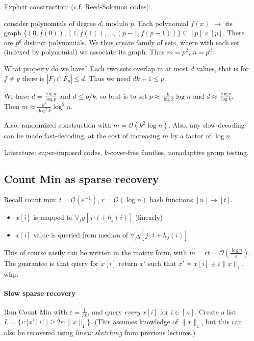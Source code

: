 \documentclass[11pt]{article}
\newcommand{\bigo}{\mathcal{O}}
\begin{document}
Explicit construction: (c.f. Reed-Solomon codes):

consider polynomials of degree $d$, modulo $p$. Each polynomial $f(x)$ $\to$ its graph $\{(0,f(0)), (1,f(1)), \ldots, (p-1,f(p-1))\} \subseteq [p] \times [p]$. There are $p^d$ distinct polynomials. We thus create family of sets, where with each set (indexed by polynomial) we associate its graph. Thus $m = p^2$, $n = p^d$.

What property do we have? Each two sets overlap in at most $d$ values, that is for $f \not = g$ there is $|F_f \cap F_g| \le d$. Thus we need $dk + 1 \le p$.

We have $d = \frac{\log n}{\log p}$ and $d \le p/k$, so best is to set $p \approx \frac{k}{\log k} \log n$ and $d \approx \frac{\log n}{\log k}$. Then $m \approx \frac{k^2}{\log^2 k} \log^2 n$.


Also: randomized construction with $m =\bigo(k^2 \log n)$. Also, any slow-decoding can be made fast-decoding, at the cost of increasing $m$ by a factor of $\log n$.

Literature: super-imposed codes, $k$-cover-free families, nonadaptive group testing.
\subsection{Count Min as sparse recovery}
Recall count min: $t = \bigo(\varepsilon^{-1})$, $r = \bigo(\log n)$ hash functions $[n] \to [t]$.
\begin{itemize}
\item $x[i]$ is mapped to $\forall_j y[j \cdot t + h_j(i)]$ (linearly)
\item $x[i]$ value is queried from median of $\forall_j y[j \cdot t + h_j(i)]$
\end{itemize}
This of course easily can be written in the matrix form, with $m = rt = \bigo(\frac{\log n}{\varepsilon})$. 
The guarantee is that query for $x[i]$ return $x'$ such that $x' = x[i] \pm \varepsilon \|x\|_1$, whp.

\paragraph{Slow sparse recovery}
Run Count Min with $\varepsilon = \frac{1}{3k}$, and query \emph{every} $x[i]$ for $i \in [n]$. Create a list $L = \{ i : |x'[i]| \ge  2\varepsilon \cdot \|x\|_1 \}$. (This assumes knowledge of $\|x\|_1$, but this can also be recovered using \emph{linear sketching} from previous lectures.)
\end{document}
